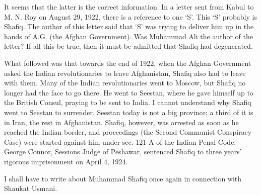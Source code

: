 It seems that the latter is the correct information. In a letter sent from Kabul to M. N. Roy on August 29, 1922, there is a reference to one ‘S’. This ‘S’ probably is Shafiq. The 
author of this letter said that ‘S' was trying to deliver him up in the hands of A.G. (the Afghan Government). Was Muhammad Ali the author of the letter? If all this be true, then it must be admitted that Shafiq had degenerated. 

What followed was that towards the end of 1922, when the Afghan Government asked the Indian revolutionaries to leave Afghanistan, Shafiq also had to leave with them. Many of the Indian revolutionaries went to Moscow, but Shafiq no longer had the face to go there. He went to 
Seestan, where he gave himself up to the British Consul, praying to be sent to India. I cannot understand why Shafiq went to Seestan to surrender. Seestan today is not a big province; a third of it is in Iran, the rest in Afghanistan. Shafiq, however, was arrested as soon as he reached the Indian border, and proceedings (the Second Communist Conspiracy Case) were started against him under sec. 121-A of the Indian Penal Code. George Connor, Sessions Judge of Peshawar, sentenced Shafiq to three years’ rigorous imprisonment on April 4, 1924. 

I shall have to write about Muhammad Shafiq once again in connection with Shaukat Usmani. 


